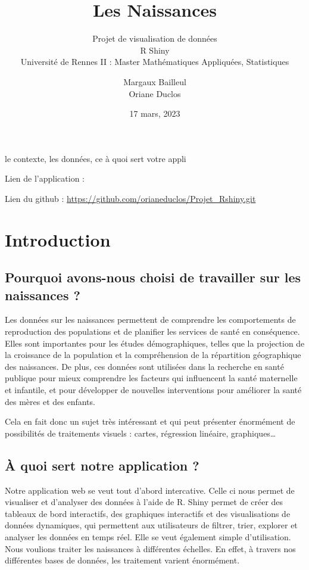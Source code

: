 \documentclass[
]{article}
\title{Les Naissances}
\subtitle{Projet de visualisation de données\\
R Shiny\\
Université de Rennes II : Master Mathématiques Appliquées, Statistiques}
\author{Margaux Bailleul\\
Oriane Duclos}
\date{17 mars, 2023}
\begin{document}
\maketitle

{
\setcounter{tocdepth}{2}
\tableofcontents
}
le contexte, les données, ce à quoi sert votre appli

Lien de l'application :

Lien du github : \url{https://github.com/orianeduclos/Projet_Rshiny.git}

\hypertarget{introduction}{%
\section{Introduction}\label{introduction}}

\hypertarget{pourquoi-avons-nous-choisi-de-travailler-sur-les-naissances}{%
\subsection{Pourquoi avons-nous choisi de travailler sur les naissances
?}\label{pourquoi-avons-nous-choisi-de-travailler-sur-les-naissances}}

Les données sur les naissances permettent de comprendre les
comportements de reproduction des populations et de planifier les
services de santé en conséquence. Elles sont importantes pour les études
démographiques, telles que la projection de la croissance de la
population et la compréhension de la répartition géographique des
naissances. De plus, ces données sont utilisées dans la recherche en
santé publique pour mieux comprendre les facteurs qui influencent la
santé maternelle et infantile, et pour développer de nouvelles
interventions pour améliorer la santé des mères et des enfants.

Cela en fait donc un sujet très intéressant et qui peut présenter
énormément de possibilités de traitements visuels : cartes, régression
linéaire, graphiques\ldots{}

\hypertarget{uxe0-quoi-sert-notre-application}{%
\subsection{À quoi sert notre application
?}\label{uxe0-quoi-sert-notre-application}}

Notre application web se veut tout d'abord intercative. Celle ci nous
permet de visualiser et d'analyser des données à l'aide de R. Shiny
permet de créer des tableaux de bord interactifs, des graphiques
interactifs et des visualisations de données dynamiques, qui permettent
aux utilisateurs de filtrer, trier, explorer et analyser les données en
temps réel. Elle se veut également simple d'utilisation. Nous voulions
traiter les naissances à différentes échelles. En effet, à travers nos
différentes bases de données, les traitement varient énormément.
\end{document}
